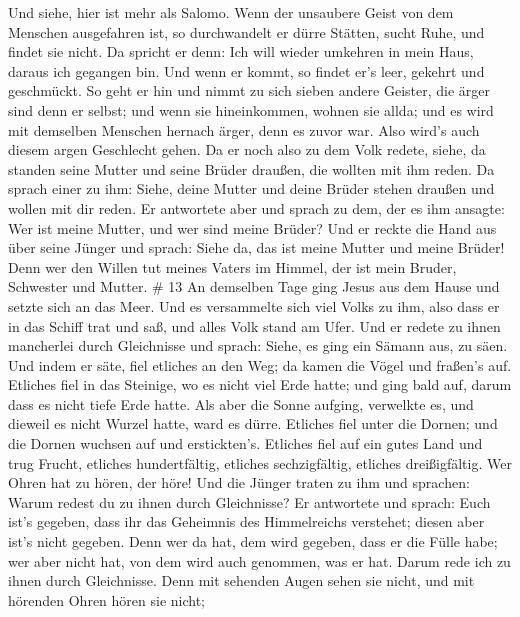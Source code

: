 Und siehe, hier ist mehr als Salomo.  Wenn der unsaubere
Geist von dem Menschen ausgefahren ist, so durchwandelt er dürre
Stätten, sucht Ruhe, und findet sie nicht.  Da spricht er
denn: Ich will wieder umkehren in mein Haus, daraus ich gegangen bin.
Und wenn er kommt, so findet er's leer, gekehrt und geschmückt.
 So geht er hin und nimmt zu sich sieben andere Geister,
die ärger sind denn er selbst; und wenn sie hineinkommen, wohnen sie
allda; und es wird mit demselben Menschen hernach ärger, denn es zuvor
war. Also wird's auch diesem argen Geschlecht gehen.  Da er
noch also zu dem Volk redete, siehe, da standen seine Mutter und seine
Brüder draußen, die wollten mit ihm reden.  Da sprach einer
zu ihm: Siehe, deine Mutter und deine Brüder stehen draußen und wollen
mit dir reden.  Er antwortete aber und sprach zu dem, der
es ihm ansagte: Wer ist meine Mutter, und wer sind meine Brüder?
 Und er reckte die Hand aus über seine Jünger und sprach:
Siehe da, das ist meine Mutter und meine Brüder!  Denn wer
den Willen tut meines Vaters im Himmel, der ist mein Bruder, Schwester
und Mutter. \# 13  An demselben Tage ging Jesus aus dem
Hause und setzte sich an das Meer.  Und es versammelte sich
viel Volks zu ihm, also dass er in das Schiff trat und saß, und alles
Volk stand am Ufer.  Und er redete zu ihnen mancherlei durch
Gleichnisse und sprach: Siehe, es ging ein Sämann aus, zu säen.
 Und indem er säte, fiel etliches an den Weg; da kamen die
Vögel und fraßen's auf.  Etliches fiel in das Steinige, wo
es nicht viel Erde hatte; und ging bald auf, darum dass es nicht tiefe
Erde hatte.  Als aber die Sonne aufging, verwelkte es, und
dieweil es nicht Wurzel hatte, ward es dürre.  Etliches fiel
unter die Dornen; und die Dornen wuchsen auf und erstickten's.
 Etliches fiel auf ein gutes Land und trug Frucht, etliches
hundertfältig, etliches sechzigfältig, etliches dreißigfältig.
 Wer Ohren hat zu hören, der höre!  Und die
Jünger traten zu ihm und sprachen: Warum redest du zu ihnen durch
Gleichnisse?  Er antwortete und sprach: Euch ist's gegeben,
dass ihr das Geheimnis des Himmelreichs verstehet; diesen aber ist's
nicht gegeben.  Denn wer da hat, dem wird gegeben, dass er
die Fülle habe; wer aber nicht hat, von dem wird auch genommen, was er
hat.  Darum rede ich zu ihnen durch Gleichnisse. Denn mit
sehenden Augen sehen sie nicht, und mit hörenden Ohren hören sie nicht;
